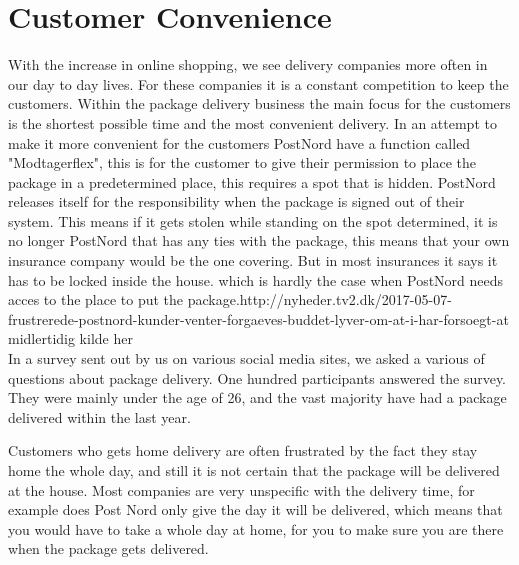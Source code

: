 \documentclass[12pt]{report}
\begin{document}
\section{Customer Convenience}
With the increase in online shopping, we see delivery companies more often in our day to day lives. For these companies it is a constant competition to keep the customers.
Within the package delivery business the main focus for the customers is the shortest possible time and the most convenient delivery. In an attempt to make it more convenient for the customers PostNord have a function called "Modtagerflex", this is for the customer to give their permission to place the package in a predetermined place, this requires a spot that is hidden. PostNord releases itself for the responsibility when the package is signed out of their system. This means if it gets stolen while standing on the spot determined, it is no longer PostNord that has any ties with the package, this means that your own insurance company would be the one covering. But in most insurances it says it has to be locked inside the house. which is hardly the case when PostNord needs acces to the place to put the package.http://nyheder.tv2.dk/2017-05-07-frustrerede-postnord-kunder-venter-forgaeves-buddet-lyver-om-at-i-har-forsoegt-at midlertidig kilde her\\\hspace*{5 mm}
In a survey sent out by us on various social media sites, we asked a various of questions about package delivery. One hundred participants answered the survey. They were mainly under the age of 26, and the vast majority have had a package delivered within the last year.

Customers who gets home delivery are often frustrated by the fact they stay home the whole day, and still it is not certain that the package will be delivered at the house. Most companies are very unspecific with the delivery time, for example does Post Nord only give the day it will be delivered, which means that you would have to take a whole day at home, for you to make sure you are there when the package gets delivered.
\end{document}
